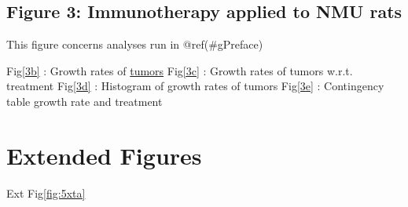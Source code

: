 \documentclass[
]{book}
\begin{document}
\hypertarget{figure-3-immunotherapy-applied-to-nmu-rats}{%
\section*{Figure 3: Immunotherapy applied to NMU rats}\label{figure-3-immunotherapy-applied-to-nmu-rats}}

This figure concerns analyses run in @ref(\#gPreface)

Fig\ref{3b} : Growth rates of \protect\hyperlink{fig:3b}{tumors}
Fig\ref{3c} : Growth rates of tumors w.r.t. treatment
Fig\ref{3d} : Histogram of growth rates of tumors
Fig\ref{3e} : Contingency table growth rate and treatment

\hypertarget{extended-figures}{%
\chapter{Extended Figures}\label{extended-figures}}

Ext Fig\ref{fig:5xta}

  
\end{document}
